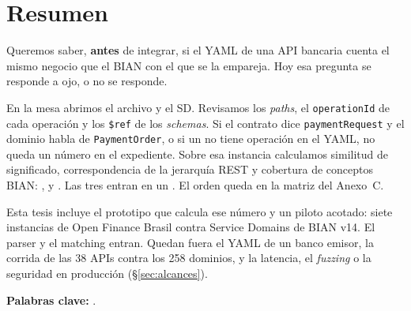 \chapter*{Resumen}


Queremos saber, \textbf{antes} de integrar, si el YAML de una API bancaria cuenta el mismo negocio
que el \ServiceDomain{} BIAN con el que se la empareja. Hoy esa pregunta se responde a ojo, o no se
responde.

En la mesa abrimos el archivo y el SD. Revisamos los \textit{paths}, el \texttt{operationId} de
cada operación y los \texttt{\$ref} de los \textit{schemas}. Si el contrato dice
\texttt{paymentRequest} y el dominio habla de \texttt{PaymentOrder}, o si un \Behavior{} no tiene
operación en el YAML, no queda un número en el expediente. Sobre esa instancia calculamos similitud
de significado, correspondencia de la jerarquía REST y cobertura de conceptos BIAN:
\SemanticScore{}, \StructuralScore{} y \CoverageScore{}. Las tres entran en un \AlignmentScore{}.
El orden queda en la matriz del Anexo~C.

Esta tesis incluye el prototipo que calcula ese número y un piloto acotado: siete instancias
de Open Finance Brasil contra Service Domains de BIAN v14. El parser y el matching entran.
Quedan fuera el YAML de un banco emisor, la corrida de las 38 APIs contra los 258 dominios,
y la latencia, el \textit{fuzzing} o la seguridad en producción (§\ref{sec:alcances}).

\vspace{0.5cm}
\noindent\textbf{Palabras clave:} \palabrasClaveES.
